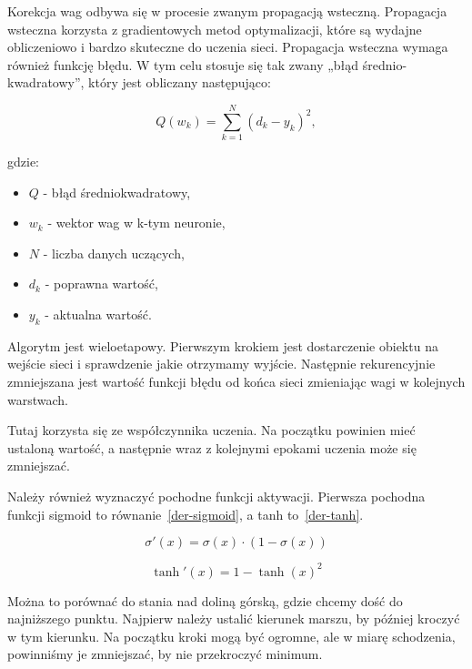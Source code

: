     Korekcja wag odbywa się w procesie zwanym propagacją wsteczną.
    Propagacja wsteczna korzysta z gradientowych metod optymalizacji, które są wydajne obliczeniowo i bardzo skuteczne do uczenia sieci.
    Propagacja wsteczna wymaga również funkcję błędu.
    W tym celu stosuje się tak zwany „błąd średnio-kwadratowy”, który jest obliczany następująco:

    \begin{equation}
        Q(w_k) = \sum_{k=1}^{N}{(d_k - y_k) ^ 2},
    \end{equation}

    gdzie:

    \begin{itemize}
        \item $Q$ - błąd średniokwadratowy,
        \item $w_k$ - wektor wag w k-tym neuronie,
        \item $N$ - liczba danych uczących,
        \item $d_k$ - poprawna wartość,
        \item $y_k$ - aktualna wartość.
    \end{itemize}

    Algorytm jest wieloetapowy.
    Pierwszym krokiem jest dostarczenie obiektu na wejście sieci i sprawdzenie jakie otrzymamy wyjście.
    Następnie rekurencyjnie zmniejszana jest wartość funkcji błędu od końca sieci zmieniając wagi w kolejnych warstwach.

    Tutaj korzysta się ze współczynnika uczenia.
    Na początku powinien mieć ustaloną wartość, a następnie wraz z kolejnymi epokami uczenia może się zmniejszać.

    Należy również wyznaczyć pochodne funkcji aktywacji.
    Pierwsza pochodna funkcji sigmoid to równanie~\ref{der-sigmoid}, a tanh to~\ref{der-tanh}.

    \begin{equation}
        \sigma'(x) = \sigma(x) \cdot (1 - \sigma(x))
        \label{der-sigmoid}
    \end{equation}

    \begin{equation}
        \tanh'(x) = 1 - \tanh(x)^2
        \label{der-tanh}
    \end{equation}

    Można to porównać do stania nad doliną górską, gdzie chcemy dość do najniższego punktu.
    Najpierw należy ustalić kierunek marszu, by później kroczyć w tym kierunku.
    Na początku kroki mogą być ogromne, ale w miarę schodzenia, powinniśmy je zmniejszać, by nie przekroczyć minimum.

